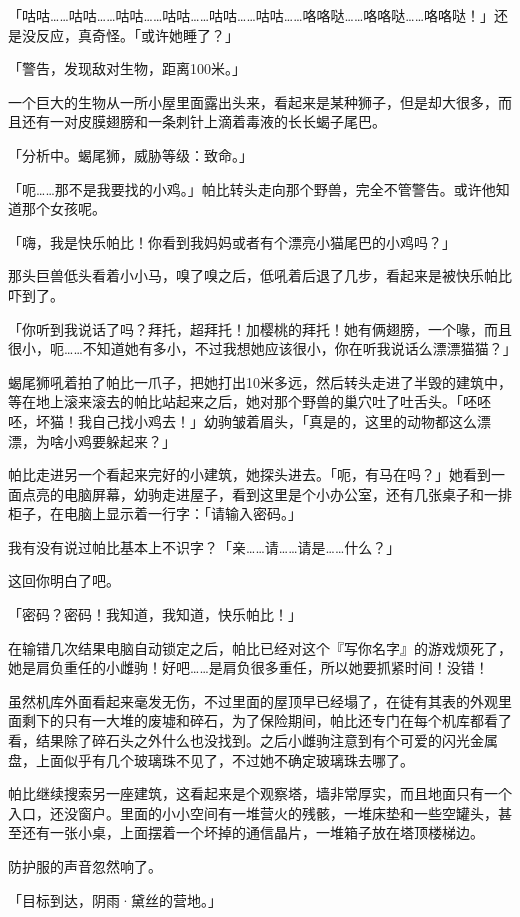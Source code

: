 「咕咕……咕咕……咕咕……咕咕……咕咕……咕咕……咯咯哒……咯咯哒……咯咯哒！」还是没反应，真奇怪。「或许她睡了？」

「{\mt 警告，发现敌对生物，距离100米。}」

一个巨大的生物从一所小屋里面露出头来，看起来是某种狮子，但是却大很多，而且还有一对皮膜翅膀和一条刺针上滴着毒液的长长蝎子尾巴。

「{\mt 分析中。蝎尾狮，威胁等级：致命。}」

「呃……那不是我要找的小鸡。」帕比转头走向那个野兽，完全不管警告。或许他知道那个女孩呢。

「嗨，我是快乐帕比！你看到我妈妈或者有个漂亮小猫尾巴的小鸡吗？」

那头巨兽低头看着小小马，嗅了嗅之后，低吼着后退了几步，看起来是被快乐帕比吓到了。

「你听到我说话了吗？拜托，超拜托！加樱桃的拜托！她有俩翅膀，一个喙，而且很小，呃……不知道她有多小，不过我想她应该很小，你在听我说话么漂漂猫猫？」

蝎尾狮吼着拍了帕比一爪子，把她打出10米多远，然后转头走进了半毁的建筑中，等在地上滚来滚去的帕比站起来之后，她对那个野兽的巢穴吐了吐舌头。「呸呸呸，坏猫！我自己找小鸡去！」幼驹皱着眉头，「真是的，这里的动物都这么漂漂，为啥小鸡要躲起来？」

帕比走进另一个看起来完好的小建筑，她探头进去。「呃，有马在吗？」她看到一面点亮的电脑屏幕，幼驹走进屋子，看到这里是个小办公室，还有几张桌子和一排柜子，在电脑上显示着一行字：「{\mt 请输入密码。}」

我有没有说过帕比基本上不识字？「亲……请……请是……什么？」

这回你明白了吧。

「密码？密码！我知道，我知道，快乐帕比！」

在输错几次结果电脑自动锁定之后，帕比已经对这个『写你名字』的游戏烦死了，她是肩负重任的小雌驹！好吧……是肩负很多重任，所以她要抓紧时间！没错！

虽然机库外面看起来毫发无伤，不过里面的屋顶早已经塌了，在徒有其表的外观里面剩下的只有一大堆的废墟和碎石，为了保险期间，帕比还专门在每个机库都看了看，结果除了碎石头之外什么也没找到。之后小雌驹注意到有个可爱的闪光金属盘，上面似乎有几个玻璃珠不见了，不过她不确定玻璃珠去哪了。

帕比继续搜索另一座建筑，这看起来是个观察塔，墙非常厚实，而且地面只有一个入口，还没窗户。里面的小小空间有一堆营火的残骸，一堆床垫和一些空罐头，甚至还有一张小桌，上面摆着一个坏掉的通信晶片，一堆箱子放在塔顶楼梯边。

防护服的声音忽然响了。

「目标到达，阴雨·黛丝的营地。」

